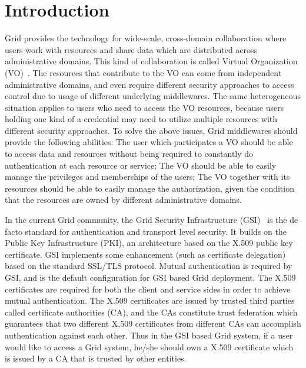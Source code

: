 \documentclass[twocolumn]{svjour3}         %
\begin{document}
\section{Introduction} 
\label{sec:intro}
Grid provides the technology for wide-scale, cross-domain collaboration where users work with resources and share data which are distributed across administrative domains. This kind of collaboration is called Virtual Organization (VO)~\cite{IFoster01}. The resources that contribute to the VO can come from independent administrative domains, and even require different security approaches to access control due to usage of different underlying middlewares. The same heterogeneous situation applies to users who need to access the VO resources, because users holding one kind of a credential may need to utilize multiple resources with different security approaches. To solve the above issues, Grid middlewares should provide the following abilities:
The user which participates a VO should be able to access data and resources without being required to constantly do authentication at each resource or service;
The VO should be able to easily manage the privileges and memberships of the users;
The VO together with its resources should be able to easily manage the authorization, given the condition that the resources are owned by different administrative domains.

In the current Grid community, the Grid Security Infrastructure (GSI)~\cite{IFoster98} is the de facto standard for authentication and transport level security. It builds on the Public Key Infrastructure (PKI), an architecture based on the X.509 public key certificate. GSI implements some enhancement (such as certificate delegation) based on the standard SSL/TLS protocol. Mutual authentication is required by GSI, and is the default configuration for GSI based Grid deployment. The X.509 certificates are required for both the client and service sides in order to achieve mutual authentication. The X.509 certificates are issued by trusted third parties called certificate authorities (CA), and the CAs constitute trust federation which guarantees that two different X.509 certificates from different CAs can accomplish authentication against each other. Thus in the GSI based Grid system, if a user would like to access a Grid system, he/she should own a X.509 certificate which is issued by a CA that is trusted by other entities.
\end{document}
